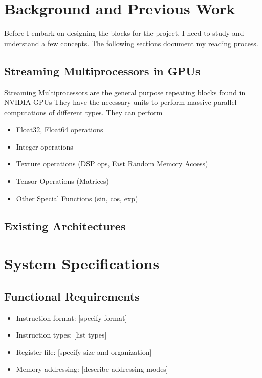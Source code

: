 \documentclass[12pt,letterpaper]{report}
\theoremstyle{definition}
\theoremstyle{plain}
\begin{document}
\chapter{Background and Previous Work}
Before I embark on designing the blocks for the project, I need to study and understand a few concepts. The following sections document my reading process.

\section{Streaming Multiprocessors in GPUs}
Streaming Multiprocessors are the general purpose repeating blocks found in NVIDIA GPUs
They have the necessary units to perform massive parallel computations of 
different types. They can perform
\begin{itemize}
    \item Float32, Float64 operations
    \item Integer operations
    \item Texture operations (DSP ops, Fast Random Memory Access)
    \item Tensor Operations (Matrices)
    \item Other Special Functions (sin, cos, exp)
\end{itemize}




\section{Existing Architectures}

\chapter{System Specifications}

\section{Functional Requirements}

\begin{designbox}[title=Instruction Set Architecture]
\begin{itemize}
    \item Instruction format: [specify format]
    \item Instruction types: [list types]
    \item Register file: [specify size and organization]
    \item Memory addressing: [describe addressing modes]
\end{itemize}
\end{designbox}
\end{document}
